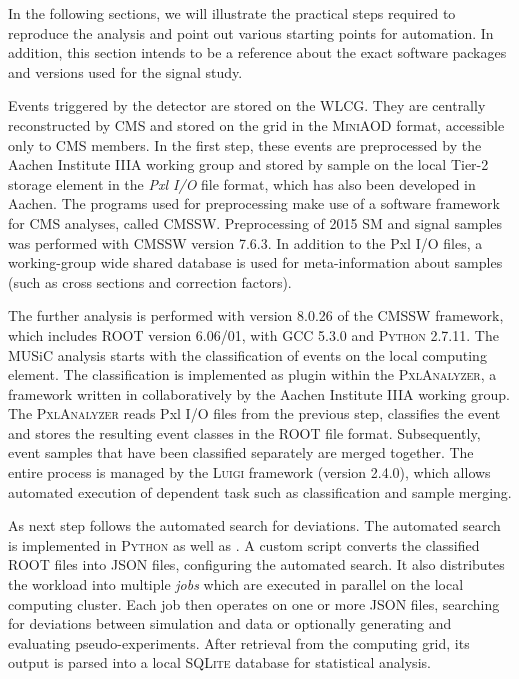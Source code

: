 In the following sections, we will illustrate the practical steps required to reproduce the analysis and point out various starting points for automation. In addition, this section intends to be a reference about the exact software packages and versions used for the signal study.

Events triggered by the detector are stored on the \ac{WLCG}. They are centrally reconstructed by \ac{CMS} and stored on the grid in the \textsc{MiniAOD} format\cite{Petrucciani:MiniAODNew}, accessible only to \ac{CMS} members. In the first step, these events are preprocessed by the Aachen Institute IIIA working group and stored by sample on the local Tier-2 storage element in the \emph{Pxl I/O} file format\cite{Bretz:DevelopmentEnvironmentVisual}, which has also been developed in Aachen. The programs used for preprocessing make use of a software framework for \ac{CMS} analyses, called \textsc{CMSSW}. Preprocessing of 2015 \ac{SM} and signal samples was performed with \textsc{CMSSW} version 7.6.3. In addition to the Pxl I/O files, a working-group wide shared database is used for meta-information about samples (such as cross sections and correction factors).

The further analysis is performed with version 8.0.26 of the \textsc{CMSSW} framework, which includes \textsc{ROOT} version 6.06/01\cite{Brun:ROOTobjectoriented}, \Cpp with \textsc{GCC} 5.3.0 and \textsc{Python} 2.7.11\cite{Oliphant:PythonScientificComputing}.
The \ac{MUSiC} analysis starts with the classification of events on the local computing element. The classification is implemented as plugin within the \textsc{PxlAnalyzer}, a framework written in \Cpp collaboratively by the Aachen Institute IIIA working group. The \textsc{PxlAnalyzer} reads Pxl I/O files from the previous step, classifies the event and stores the resulting event classes in the \textsc{ROOT} file format. Subsequently, event samples that have been classified separately are merged together. The entire process is managed by the \textsc{Luigi} framework \cite{Spotify:Luigi}(version 2.4.0), which allows automated execution of dependent task such as classification and sample merging.

As next step follows the automated search for deviations. The automated search is implemented in \textsc{Python} as well as \Cpp. A custom script converts the classified \textsc{ROOT} files into JSON files, configuring the automated search. It also distributes the workload into multiple \emph{jobs} which are executed in parallel on the local computing cluster. Each job then operates on one or more JSON files, searching for deviations between simulation and data or optionally generating and evaluating pseudo-experiments.
After retrieval from the computing grid, its output is parsed into a local \textsc{SQLite} database for statistical analysis.

